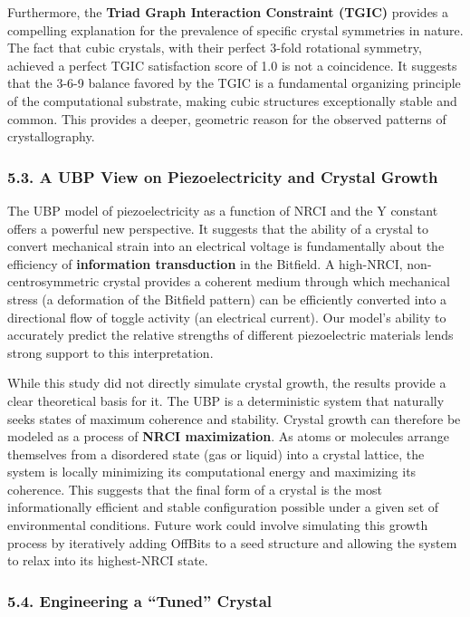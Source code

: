 Furthermore, the \textbf{Triad Graph Interaction Constraint (TGIC)}
provides a compelling explanation for the prevalence of specific crystal
symmetries in nature. The fact that cubic crystals, with their perfect
3-fold rotational symmetry, achieved a perfect TGIC satisfaction score
of 1.0 is not a coincidence. It suggests that the 3-6-9 balance favored
by the TGIC is a fundamental organizing principle of the computational
substrate, making cubic structures exceptionally stable and common. This
provides a deeper, geometric reason for the observed patterns of
crystallography.

\subsubsection{5.3. A UBP View on Piezoelectricity and Crystal
Growth}\label{a-ubp-view-on-piezoelectricity-and-crystal-growth}

The UBP model of piezoelectricity as a function of NRCI and the Y
constant offers a powerful new perspective. It suggests that the ability
of a crystal to convert mechanical strain into an electrical voltage is
fundamentally about the efficiency of \textbf{information transduction}
in the Bitfield. A high-NRCI, non-centrosymmetric crystal provides a
coherent medium through which mechanical stress (a deformation of the
Bitfield pattern) can be efficiently converted into a directional flow
of toggle activity (an electrical current). Our model's ability to
accurately predict the relative strengths of different piezoelectric
materials lends strong support to this interpretation.

While this study did not directly simulate crystal growth, the results
provide a clear theoretical basis for it. The UBP is a deterministic
system that naturally seeks states of maximum coherence and stability.
Crystal growth can therefore be modeled as a process of \textbf{NRCI
maximization}. As atoms or molecules arrange themselves from a
disordered state (gas or liquid) into a crystal lattice, the system is
locally minimizing its computational energy and maximizing its
coherence. This suggests that the final form of a crystal is the most
informationally efficient and stable configuration possible under a
given set of environmental conditions. Future work could involve
simulating this growth process by iteratively adding OffBits to a seed
structure and allowing the system to relax into its highest-NRCI state.

\subsubsection{5.4. Engineering a ``Tuned''
Crystal}\label{engineering-a-tuned-crystal}


